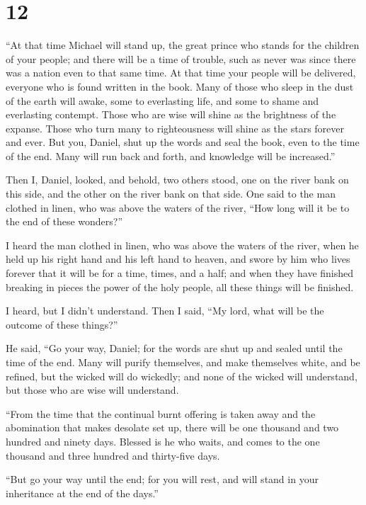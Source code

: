 \hypertarget{section-11}{%
\section{12}\label{section-11}}

 ``At that time Michael will stand up, the great prince
who stands for the children of your people; and there will be a time of
trouble, such as never was since there was a nation even to that same
time. At that time your people will be delivered, everyone who is found
written in the book.  Many of those who sleep in the dust
of the earth will awake, some to everlasting life, and some to shame and
everlasting contempt.  Those who are wise will shine as
the brightness of the expanse. Those who turn many to righteousness will
shine as the stars forever and ever.  But you, Daniel,
shut up the words and seal the book, even to the time of the end. Many
will run back and forth, and knowledge will be increased.''

 Then I, Daniel, looked, and behold, two others stood, one
on the river bank on this side, and the other on the river bank on that
side.  One said to the man clothed in linen, who was above
the waters of the river, ``How long will it be to the end of these
wonders?''

 I heard the man clothed in linen, who was above the
waters of the river, when he held up his right hand and his left hand to
heaven, and swore by him who lives forever that it will be for a time,
times, and a half; and when they have finished breaking in pieces the
power of the holy people, all these things will be finished.

 I heard, but I didn't understand. Then I said, ``My lord,
what will be the outcome of these things?''

 He said, ``Go your way, Daniel; for the words are shut up
and sealed until the time of the end.  Many will purify
themselves, and make themselves white, and be refined, but the wicked
will do wickedly; and none of the wicked will understand, but those who
are wise will understand.

 ``From the time that the continual burnt offering is
taken away and the abomination that makes desolate set up, there will be
one thousand and two hundred and ninety days.  Blessed is
he who waits, and comes to the one thousand and three hundred and
thirty-five days.

 ``But go your way until the end; for you will rest, and
will stand in your inheritance at the end of the days.''
